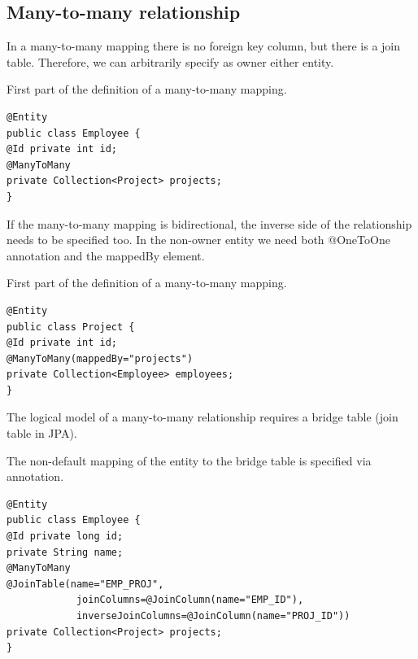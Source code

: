 \subsection*{Many-to-many relationship}
    In a many-to-many mapping there is no foreign key column, but there is a join table. Therefore, we can arbitrarily specify as owner either entity.
\begin{example}
    First part of the definition of a many-to-many mapping. 
        \begin{lstlisting}[style=Java]
@Entity
public class Employee {
@Id private int id;
@ManyToMany
private Collection<Project> projects;
}
        \end{lstlisting}
    \end{example}
    If the many-to-many mapping is bidirectional, the inverse side of the relationship needs to be specified too. In the non-owner entity we need both @OneToOne 
    annotation and the mappedBy element.
    \begin{example}
    First part of the definition of a many-to-many mapping. 
        \begin{lstlisting}[style=Java]
@Entity
public class Project {
@Id private int id;
@ManyToMany(mappedBy="projects")
private Collection<Employee> employees;
}
        \end{lstlisting}
    \end{example}
    The logical model of a many-to-many relationship requires a bridge table (join table in JPA). 
    \begin{example}
        The non-default mapping of the entity to the bridge table is specified via annotation. 
        \begin{lstlisting}[style=Java]
@Entity
public class Employee {
@Id private long id;
private String name;
@ManyToMany
@JoinTable(name="EMP_PROJ",
            joinColumns=@JoinColumn(name="EMP_ID"),
            inverseJoinColumns=@JoinColumn(name="PROJ_ID"))
private Collection<Project> projects;
}
        \end{lstlisting}
    \end{example}

